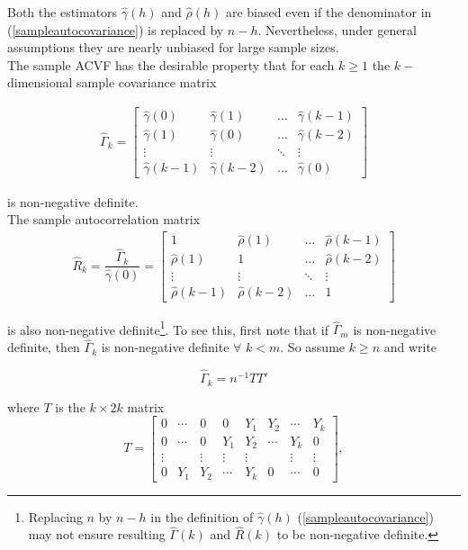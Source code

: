 \documentclass[11pt, a4paper]{article}
\numberwithin{equation}{section}
\theoremstyle{definition}
\begin{document}
Both the estimators $\hat{\gamma}(h)$ and $\hat{\rho}(h)$ are biased even if the denominator in (\ref{sampleautocovariance}) is replaced by $n-h$. Nevertheless, under general assumptions they are nearly unbiased for large sample sizes. \\[0.25em]

The sample ACVF has the desirable property that for each $k \geq 1$ the $k-$dimensional sample covariance matrix

\begin{align*}
\hat{\Gamma}_k =
\begin{bmatrix}
\hat{\gamma}(0) & \hat{\gamma}(1) & \ldots & \hat{\gamma}(k-1) \\
\hat{\gamma}(1) & \hat{\gamma}(0) & \ldots & \hat{\gamma}(k-2) \\
\vdots & \vdots & \ddots & \vdots \\
\hat{\gamma}(k-1) & \hat{\gamma}(k-2) & \ldots & \hat{\gamma}(0)
\end{bmatrix}
\end{align*}

is non-negative definite. \\[0.25em]

The sample autocorrelation matrix
\begin{align*}
\hat{R}_k = \dfrac{\hat{\Gamma}_k}{\hat{\gamma}(0)} = 
\begin{bmatrix}
1 & \hat{\rho}(1) & \ldots & \hat{\rho}(k-1) \\
\hat{\rho}(1) & 1 & \ldots & \hat{\rho}(k-2) \\
\vdots & \vdots & \ddots & \vdots \\
\hat{\rho}(k-1) & \hat{\rho}(k-2) & \ldots & 1
\end{bmatrix}
\end{align*}

is also non-negative definite\footnote{Replacing $n$ by $n-h$ in the definition of $\hat{\gamma}(h)$ (\ref{sampleautocovariance}) may not ensure resulting $\hat{\Gamma}(k)$ and $\hat{R}(k)$ to be non-negative definite.}. To see this, first note that if $\hat{\Gamma}_m$ is non-negative definite, then $\hat{\Gamma}_k$ is non-negative definite $\forall$ $k < m$. So assume $k \geq n$ and write

$$\hat{\Gamma}_k = n^{-1}TT'$$

where $T$ is the $k \times 2k$ matrix
$$T =
\begin{bmatrix}
0 & \cdots & 0 & 0 & Y_1 & Y_2 & \cdots & Y_k \\
0 & \cdots & 0 & Y_1 & Y_2 & \cdots & Y_k & 0 \\
\vdots &  & \vdots & \vdots & \vdots &  & \vdots & \vdots \\
0 & Y_1 & Y_2 & \cdots & Y_k & 0 & \cdots & 0
\end{bmatrix},
$$
\end{document}
